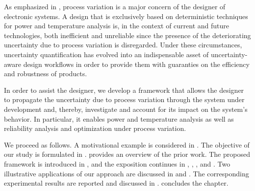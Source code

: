 As emphasized in , process variation is a major
concern of the designer of electronic systems. A design that is exclusively
based on deterministic techniques for power and temperature analysis is, in the
context of current and future technologies, both inefficient and unreliable
since the presence of the deteriorating uncertainty due to process variation is
disregarded. Under these circumstances, uncertainty quantification
\cite{maitre2010} has evolved into an indispensable asset of uncertainty-aware
design workflows in order to provide them with guaranties on the efficiency and
robustness of products.

In order to assist the designer, we develop a framework that allows the designer
to propagate the uncertainty due to process variation through the system under
development and, thereby, investigate and account for its impact on the system's
behavior. In particular, it enables power and temperature analysis as well as
reliability analysis and optimization under process variation.

We proceed as follows. A motivational example is considered in
. The objective of our study is formulated in
.  provides an overview of the prior work.
The proposed framework is introduced in , and the
exposition continues in ,
, , and
. Two illustrative applications of our approach
are discussed in  and
. The corresponding experimental results are reported
and discussed in .  concludes the
chapter.
